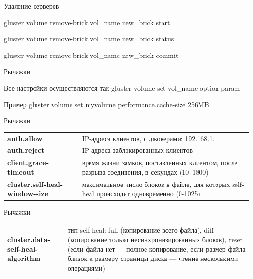\documentclass{beamer}
\begin{document}
\begin{frame}{Удаление серверов}
	\begin{block}{} 
		 gluster volume remove-brick vol\_name new\_brick start

		\pause
		 gluster volume remove-brick vol\_name new\_brick status

		\pause
		 gluster volume remove-brick vol\_name new\_brick commit
	\end{block}
\end{frame}

\begin{frame}{Рычажки}
	\begin{block}{Все настройки осуществляются так}
		  gluster volume set vol\_name option param	
	\end{block}
	\begin{block}{Пример}
		  gluster volume set myvolume performance.cache-size 256MB	
	\end{block}
\end{frame}

\begin{frame}{Рычажки}
	\begin{block}{}
		\begin{tabular}{ p{6cm} p{5cm} }
			\textbf{auth.allow} & IP-адреса клиентов, с джокерами: 192.168.1.\* \\
			\textbf{auth.reject} &  IP-адреса заблокированных клиентов \\
			\textbf{client.grace-timeout} & время жизни замков, поставленных клиентом, после разрыва соединения, в секундах (10--1800) \\
			\textbf{cluster.self-heal-window-size} & максимальное число блоков в файле, для которых self-heal происходит одновременно (0-1025)\\
		\end{tabular}
	\end{block}
\end{frame}

\begin{frame}{Рычажки}
	\begin{block}{}
		\begin{tabular}{ p{6cm} p{5cm} }
			\textbf{cluster.data-self-heal-algorithm} & тип self-heal: full (копирование всего файла), diff (копирование только несинхронизированных блоков), reset (если файла нет --- полное копирование, если размер файла близок к размеру страницы диска --- чтение несколькими операциями) \\
		\end{tabular}
	\end{block}
\end{frame}
\end{document}
